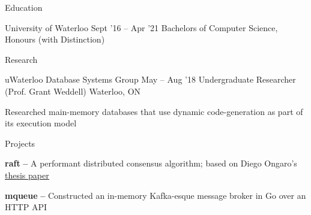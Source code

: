 \documentclass{resume} %
\begin{document}
\begin{rSection}{Education}
  \begin{rEducationSection}{University of Waterloo}
		     {Sept '16 -- Apr '21}
		     {Bachelors of Computer Science, Honours
             (with Distinction)}
  \end{rEducationSection}
\end{rSection} 


\begin{rSection}{Research}
  \begin{rSubsection}{uWaterloo Database Systems Group}
	  {May -- Aug '18}
    {Undergraduate Researcher (Prof. Grant Weddell)}
	  {Waterloo, ON}
    \item Researched main-memory databases that use dynamic
      code-generation as part of its execution model
  \end{rSubsection}
\end{rSection}

\begin{rSection}{Projects}
  
  \begin{rProjectSection}
    \item \textbf {raft} {\textbf{--}} A performant distributed
      consensus algorithm; based on Diego Ongaro's
      \href{https://raft.github.io/raft.pdf}{\underline{thesis paper}}
    \item \textbf {mqueue} {\textbf{--}} Constructed an in-memory Kafka-esque message broker in Go
      over an HTTP API
  \end{rProjectSection}

 
\end{rSection}
\end{document}
